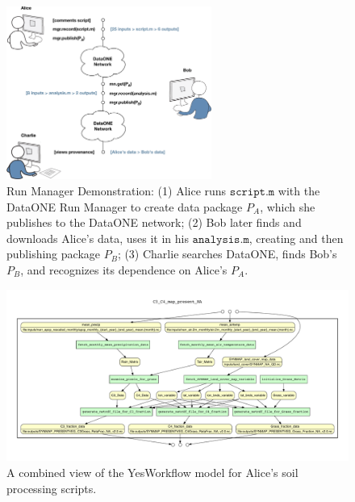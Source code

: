 \documentclass[a4paper]{llncs}
\newcommand{\mytt}[1]{\ensuremath{\mathtt{#1}}}
\newcommand{\authornote}[2] {
    \begin{center}
        \framebox{
            {\begin{minipage}[t]{0.9\linewidth}
                \color{red}
                \raggedright  \textbf{[#1]}~ \scriptsize #2 \normalsize
            \end{minipage}}
    }
    \end{center}
}
\begin{document}
\begin{figure}[t] \centering \includegraphics[width=0.6\textwidth]{figs/alice-bob-charlie-sequence-crop} \caption{Run Manager Demonstration: (1) Alice runs \mytt{script.m} with the DataONE Run Manager to create data package $P_A$, which she publishes to the DataONE network; (2) Bob later finds and downloads Alice's data, uses it in his \mytt{analysis.m}, creating and then publishing package $P_B$; (3) Charlie searches DataONE, finds Bob's $P_B$, and recognizes its dependence on Alice's $P_A$.}  \label{fig0} \end{figure}

\begin{figure}[!h] \centering \includegraphics[width=1.05\textwidth]{figs/C3_C4_map_present_NA_workflow_comb_diagram} \caption{A combined view of the YesWorkflow model for Alice's soil processing scripts.}  \label{yw-graph} \end{figure}

\end{document}
